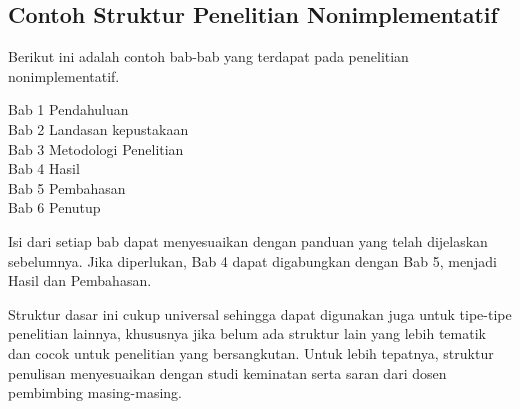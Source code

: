 \subsection{Contoh Struktur Penelitian Nonimplementatif}

Berikut ini adalah contoh bab-bab yang terdapat pada penelitian nonimplementatif. 

\begin{displayquote}
  Bab 1 Pendahuluan \\
  Bab 2 Landasan kepustakaan \\
  Bab 3 Metodologi Penelitian \\
  Bab 4 Hasil \\
  Bab 5 Pembahasan \\
  Bab 6 Penutup
\end{displayquote}

Isi dari setiap bab dapat menyesuaikan dengan panduan yang telah dijelaskan sebelumnya. Jika diperlukan, Bab 4 dapat digabungkan dengan Bab 5, menjadi Hasil dan Pembahasan. 

Struktur dasar ini cukup universal sehingga dapat digunakan juga untuk tipe-tipe penelitian lainnya, khususnya jika belum ada struktur lain yang lebih tematik dan cocok untuk penelitian yang bersangkutan. Untuk lebih tepatnya, struktur penulisan menyesuaikan dengan studi keminatan serta saran dari dosen pembimbing masing-masing.
